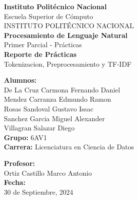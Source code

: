 \documentclass[12pt,a4paper]{article}
\begin{document}
\begin{titlepage}
    \centering
    \vspace*{2cm}
    
    {\huge\bfseries Instituto Politécnico Nacional}\\[0.5cm]
    {\Large Escuela Superior de Cómputo}\\[1.5cm]
    
    {\Large INSTITUTO POLITÉCNICO NACIONAL}\\[1cm]
    
    {\huge\bfseries Procesamiento de Lenguaje Natural}\\[0.5cm]
    {\Large Primer Parcial - Prácticas}\\[2cm]
    
    {\Large\bfseries Reporte de Prácticas}\\[0.5cm]
    {\large Tokenizacion, Preprocesamiento y TF-IDF}\\[2cm]
    
    \begin{minipage}{0.4\textwidth}
        \begin{flushleft}
            \textbf{Alumnos:}\\
            De La Cruz Carmona Fernando Daniel\\[0.3cm]
            Mendez Carranza Edmundo Ramon\\[0.3cm]
            Rosas Sandoval Gustavo Issac\\[0.3cm]
            Sanchez Garcia Miguel Alexander\\[0.3cm]
            Villagran Salazar Diego\\[0.5cm]
\textbf{Grupo:} 6AV1\\
            \textbf{Carrera:} Licenciatura en Ciencia de Datos
        \end{flushleft}
    \end{minipage}
    \hfill
    \begin{minipage}{0.4\textwidth}
        \begin{flushright}
            \textbf{Profesor:}\\
            Ortiz Castillo Marco Antonio\\[0.5cm]
            \textbf{Fecha:}\\
            30 de Septiembre, 2024
        \end{flushright}
    \end{minipage}
    
    \vfill
\end{titlepage}
\end{document}
